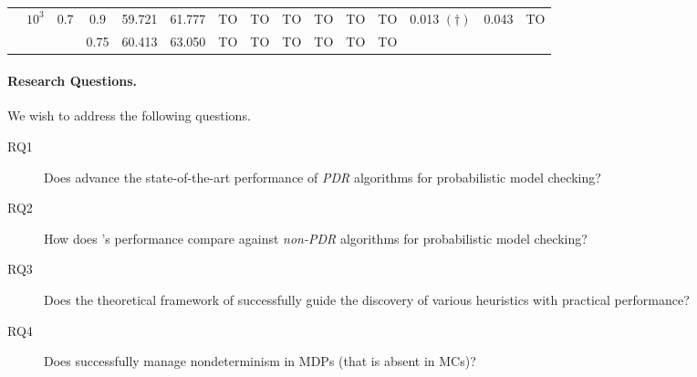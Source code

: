 \begin{table}
\begin{lrbox}{\lstbox}
\begin{minipage}{\textheight}
\begin{tabular}{ccccccccccccccc}
				\cmidrule[0.5pt](r){2-15}
				                                               & \multirow{2}{*}{$10^3$}    & \multirow{2}{*}{0.7}      & 0.9                      & 59.721      & 61.777       & TO          & TO       & TO      & TO      & TO      & TO      & \multirow{2}{*}{0.013 $(\dagger)$} & \multirow{2}{*}{0.043}   & \multirow{2}{*}{TO}    \\
				                                               &                            &                           & 0.75                     & 60.413      & 63.050       & TO          & TO       & TO      & TO      & TO      & TO                                                                                               \\
				\bottomrule
			\end{tabular}
		\end{minipage}\end{lrbox}
	\scalebox{.85}{\centering\usebox\lstbox}
\end{table}

\paragraph{Research Questions.} We wish to address the following questions.
\begin{description}
	\item[RQ1] Does \ADPDR{} advance the state-of-the-art performance of \emph{PDR} algorithms for probabilistic model checking?
	\item[RQ2] How does \ADPDR{}'s performance compare against \emph{non-PDR} algorithms for probabilistic model checking?
	\item[RQ3] Does the  theoretical framework of \ADPDR{} successfully guide the discovery of various heuristics with practical performance?
	\item[RQ4] Does \ADPDR{} successfully manage nondeterminism in MDPs (that is absent in MCs)?
\end{description}

